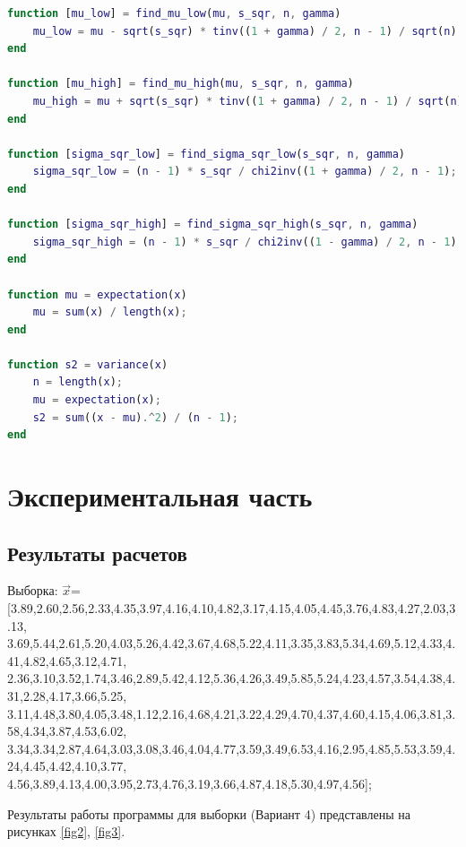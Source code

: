 \documentclass[12pt]{report}
\begin{document}
\begin{lstlisting}[language=Matlab]
function [mu_low] = find_mu_low(mu, s_sqr, n, gamma)
	mu_low = mu - sqrt(s_sqr) * tinv((1 + gamma) / 2, n - 1) / sqrt(n);
end

function [mu_high] = find_mu_high(mu, s_sqr, n, gamma)
	mu_high = mu + sqrt(s_sqr) * tinv((1 + gamma) / 2, n - 1) / sqrt(n);
end

function [sigma_sqr_low] = find_sigma_sqr_low(s_sqr, n, gamma)
	sigma_sqr_low = (n - 1) * s_sqr / chi2inv((1 + gamma) / 2, n - 1);
end

function [sigma_sqr_high] = find_sigma_sqr_high(s_sqr, n, gamma)
	sigma_sqr_high = (n - 1) * s_sqr / chi2inv((1 - gamma) / 2, n - 1);
end

function mu = expectation(x)
	mu = sum(x) / length(x);
end

function s2 = variance(x)
	n = length(x);
	mu = expectation(x);
	s2 = sum((x - mu).^2) / (n - 1);
end
\end{lstlisting}


\chapter{Экспериментальная часть}

\section{Результаты расчетов}

Выборка:
$\vec x$=[3.89,2.60,2.56,2.33,4.35,3.97,4.16,4.10,4.82,3.17,4.15,4.05,4.45,3.76,4.83,4.27,2.03,3.13,\\3.69,5.44,2.61,5.20,4.03,5.26,4.42,3.67,4.68,5.22,4.11,3.35,3.83,5.34,4.69,5.12,4.33,4.41,4.82,4.65,3.12,4.71,\\2.36,3.10,3.52,1.74,3.46,2.89,5.42,4.12,5.36,4.26,3.49,5.85,5.24,4.23,4.57,3.54,4.38,4.31,2.28,4.17,3.66,5.25,\\3.11,4.48,3.80,4.05,3.48,1.12,2.16,4.68,4.21,3.22,4.29,4.70,4.37,4.60,4.15,4.06,3.81,3.58,4.34,3.87,4.53,6.02,\\3.34,3.34,2.87,4.64,3.03,3.08,3.46,4.04,4.77,3.59,3.49,6.53,4.16,2.95,4.85,5.53,3.59,4.24,4.45,4.42,4.10,3.77,\\4.56,3.89,4.13,4.00,3.95,2.73,4.76,3.19,3.66,4.87,4.18,5.30,4.97,4.56];

Результаты работы программы для выборки (Вариант 4) представлены на рисунках \ref{fig2}, \ref{fig3}.
\end{document}

